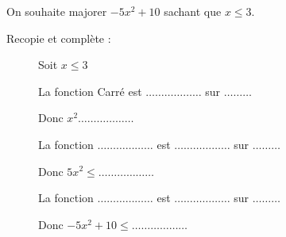 
On souhaite majorer $-5x^2 + 10$ sachant que $x \leq 3$.

Recopie et complète :
\begin{description}
\item[] Soit $x \leq 3$
\item[] La fonction Carré est $\ldots \ldots  \ldots  \ldots  \ldots  \ldots $ sur $ \ldots  \ldots  \ldots $
\item[] Donc $x^2 \ldots \ldots  \ldots  \ldots  \ldots  \ldots $
\item[] La fonction $\ldots \ldots  \ldots  \ldots  \ldots  \ldots $ est $\ldots \ldots  \ldots  \ldots  \ldots  \ldots $ sur $ \ldots  \ldots  \ldots $
\item[] Donc $5x^2 \leq \ldots \ldots  \ldots  \ldots  \ldots  \ldots $
\item[] La fonction $\ldots \ldots  \ldots  \ldots  \ldots  \ldots $ est $\ldots \ldots  \ldots  \ldots  \ldots  \ldots $ sur $ \ldots  \ldots  \ldots $
\item[] Donc $-5x^2 + 10 \leq \ldots \ldots  \ldots  \ldots  \ldots  \ldots $
\end{description}






